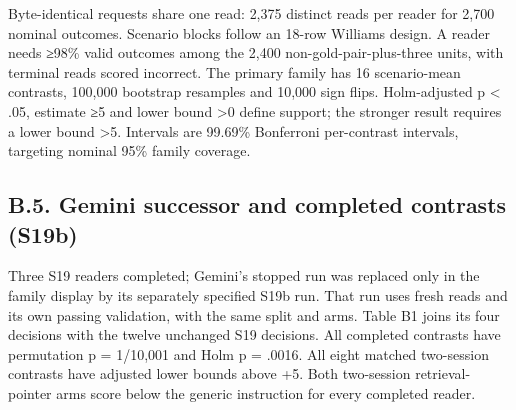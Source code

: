 \documentclass[11pt]{article}
\begin{document}
Byte-identical requests share one read: 2,375 distinct reads per reader for 2,700 nominal outcomes. Scenario blocks follow an 18-row Williams design. A reader needs ≥98\% valid outcomes among the 2,400 non-gold-pair-plus-three units, with terminal reads scored incorrect. The primary family has 16 scenario-mean contrasts, 100,000 bootstrap resamples and 10,000 sign flips. Holm-adjusted p \textless{} .05, estimate ≥5 and lower bound \textgreater0 define support; the stronger result requires a lower bound \textgreater5. Intervals are 99.69\% Bonferroni per-contrast intervals, targeting nominal 95\% family coverage.

\subsection{B.5. Gemini successor and completed contrasts (S19b)}\label{b.5.-gemini-successor-and-completed-contrasts-s19b}

Three S19 readers completed; Gemini's stopped run was replaced only in the family display by its separately specified S19b run. That run uses fresh reads and its own passing validation, with the same split and arms. Table B1 joins its four decisions with the twelve unchanged S19 decisions. All completed contrasts have permutation p = 1/\allowbreak{}10,001 and Holm p = .0016. All eight matched two-session contrasts have adjusted lower bounds above +5. Both two-session retrieval-pointer arms score below the generic instruction for every completed reader.

\par\begingroup
\small
\end{document}
